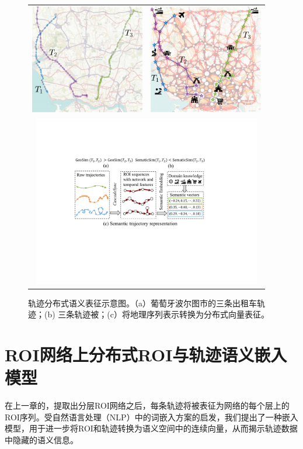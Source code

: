 \tabcolsep=0.5pt
\begin{figure}[!htb]
\centering
\begin{tabular}{cc}
\includegraphics[width=50mm]{pics/introduction1.pdf} & \includegraphics[width=50mm]{pics/introduction2_w.pdf}\\
\multicolumn{2}{c}{\includegraphics[width=100mm]{pics/introduction.pdf}}
\end{tabular}
\caption {轨迹分布式语义表征示意图。（a）葡萄牙波尔图市的三条出租车轨迹；(b) 三条轨迹被；(c）将地理序列表示转换为分布式向量表征。}
\label{fig:introduction}
\end{figure}


\section{ROI网络上分布式ROI与轨迹语义嵌入模型}
在上一章的，提取出分层ROI网络之后，每条轨迹将被表征为网络的每个层上的ROI序列。受自然语言处理（NLP）中的词嵌入方案的启发，我们提出了一种嵌入模型，用于进一步将ROI和轨迹转换为语义空间中的连续向量，从而揭示轨迹数据中隐藏的语义信息。

